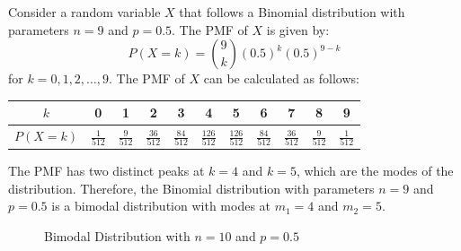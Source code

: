 \documentclass[openany]{book}
\begin{document}
\begin{example}
    Consider a random variable $X$ that follows a Binomial distribution with parameters $n = 9$ and $p = 0.5$. The PMF of $X$ is given by:
    $$P(X = k) = \binom{9}{k} (0.5)^k (0.5)^{9 - k}$$
    for $k = 0, 1, 2, \ldots, 9$. The PMF of $X$ can be calculated as follows:
    \begin{table}[H]
        \centering
        \begin{tabular}{c|cccccccccc}
            $k$ & 0 & 1 & 2 & 3 & 4 & 5 & 6 & 7 & 8 & 9 \\
            \hline
            $P(X = k)$ & $\frac{1}{512}$ & $\frac{9}{512}$ & $\frac{36}{512}$ & $\frac{84}{512}$ & $\frac{126}{512}$ & $\frac{126}{512}$ & $\frac{84}{512}$ & $\frac{36}{512}$ & $\frac{9}{512}$ & $\frac{1}{512}$ \\
        \end{tabular}
    \end{table}
    The PMF has two distinct peaks at $k = 4$ and $k = 5$, which are the modes of the distribution. Therefore, the Binomial distribution with parameters $n = 9$ and $p = 0.5$ is a bimodal distribution with modes at $m_1 = 4$ and $m_2 = 5$.
    \begin{figure}[H]
        \centering
        \caption{Bimodal Distribution with $n = 10$ and $p = 0.5$}
    \end{figure}
\end{example}
\end{document}
